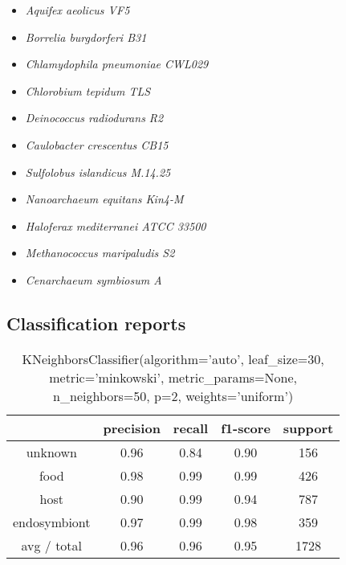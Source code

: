 \begin{itemize}
    \item		\textit{Aquifex aeolicus VF5}
    \item		\textit{Borrelia burgdorferi B31}
    \item		\textit{Chlamydophila pneumoniae CWL029}
    \item		\textit{Chlorobium tepidum TLS}
    \item		\textit{Deinococcus radiodurans R2}
    \item		\textit{Caulobacter crescentus CB15}
    \item		\textit{Sulfolobus islandicus M.14.25}
    \item		\textit{Nanoarchaeum equitans Kin4-M}
    \item		\textit{Haloferax mediterranei ATCC 33500}
    \item		\textit{Methanococcus maripaludis S2}
    \item		\textit{Cenarchaeum symbiosum A}
\end{itemize}

\subsection{Classification reports}
\label{sec:classification}

\begin{table}[H]
    \begin{tabular}{|c| c c c c |}
        \hline
        & \textbf{precision}  &  \textbf{recall} &  \textbf{f1-score} & \textbf{support} \\
        \hline
        unknown &      0.96    &  0.84  &    0.90  &      156 \\
        food    &      0.98    &  0.99  &    0.99  &    426 \\ 
        host    &      0.90    &  0.99  &    0.94  &     787 \\ 
endosymbiont    &      0.97    &  0.99  &    0.98  &     359 \\
\hline
avg / total    &      0.96    &  0.96  &    0.95  & 1728 \\
 \hline
 \end{tabular}
 \caption[K-Neighbours classifier report]{KNeighborsClassifier(algorithm='auto', leaf\_size=30, metric='minkowski',
 metric\_params=None, n\_neighbors=50, p=2, weights='uniform')}
 \end{table}

